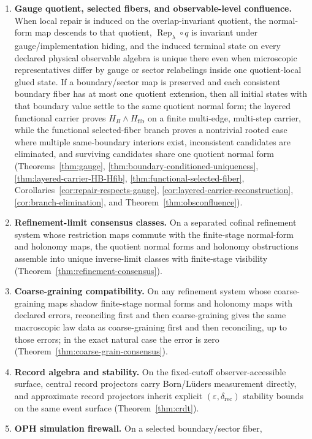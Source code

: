 \documentclass[11pt]{article}
\theoremstyle{remark}
\theoremstyle{plain}
\begin{document}
\begin{enumerate}
\item \textbf{Gauge quotient, selected fibers, and observable-level confluence.} When local repair is induced on the overlap-invariant quotient, the normal-form map descends to that quotient, \(\operatorname{Rep}_\lambda\circ q\) is invariant under gauge/implementation hiding, and the induced terminal state on every declared physical observable algebra is unique there even when microscopic representatives differ by gauge or sector relabelings inside one quotient-local glued state. If a boundary/sector map is preserved and each consistent boundary fiber has at most one quotient extension, then all initial states with that boundary value settle to the same quotient normal form; the layered functional carrier proves \(H_B\wedge H_{\mathrm{fib}}\) on a finite multi-edge, multi-step carrier, while the functional selected-fiber branch proves a nontrivial rooted case where multiple same-boundary interiors exist, inconsistent candidates are eliminated, and surviving candidates share one quotient normal form (Theorems~\ref{thm:gauge}, \ref{thm:boundary-conditioned-uniqueness}, \ref{thm:layered-carrier-HB-Hfib}, \ref{thm:functional-selected-fiber}, Corollaries~\ref{cor:repair-respects-gauge}, \ref{cor:layered-carrier-reconstruction}, \ref{cor:branch-elimination}, and Theorem~\ref{thm:obsconfluence}).
\item \textbf{Refinement-limit consensus classes.} On a separated cofinal refinement system whose restriction maps commute with the finite-stage normal-form and holonomy maps, the quotient normal forms and holonomy obstructions assemble into unique inverse-limit classes with finite-stage visibility (Theorem~\ref{thm:refinement-consensus}).
\item \textbf{Coarse-graining compatibility.} On any refinement system whose coarse-graining maps shadow finite-stage normal forms and holonomy maps with declared errors, reconciling first and then coarse-graining gives the same macroscopic law data as coarse-graining first and then reconciling, up to those errors; in the exact natural case the error is zero (Theorem~\ref{thm:coarse-grain-consensus}).
\item \textbf{Record algebra and stability.} On the fixed-cutoff observer-accessible surface, central record projectors carry Born/L\"uders measurement directly, and approximate record projectors inherit explicit \((\varepsilon,\delta_{\mathrm{rec}})\) stability bounds on the same event surface (Theorem~\ref{thm:crdt}).
\item \textbf{OPH simulation firewall.} On a selected boundary/sector fiber,

\end{enumerate}
\end{document}
